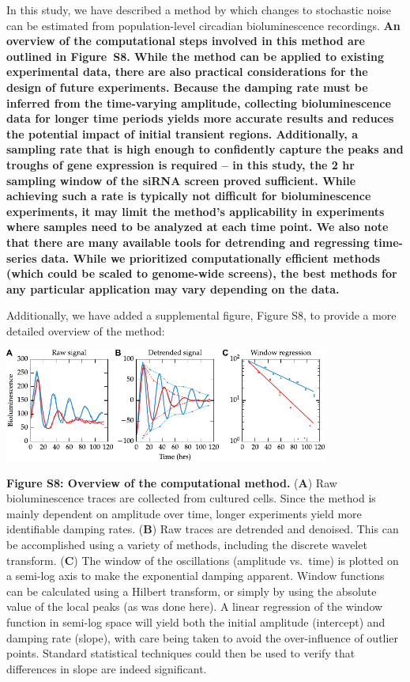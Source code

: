 \documentclass[11pt, letterpaper]{article}
\newenvironment{manuscript}[1]{\begin{center}\begin{tcolorbox}[colback=green!5!white,colframe=green!75!black,width=\textwidth,title={#1},breakable,fonttitle=\bfseries]}{\end{tcolorbox}\end{center}}
\begin{document}
\begin{manuscript}{Page 9}
 In this study, we have described a method by which changes to stochastic noise can be estimated from population-level circadian bioluminescence recordings.
 {\bfseries
An overview of the computational steps involved in this method are outlined in Figure~S8.
While the method can be applied to existing experimental data, there are also practical considerations for the design of future experiments.
Because the damping rate must be inferred from the time-varying amplitude, collecting bioluminescence data for longer time periods yields more accurate results and reduces the potential impact of initial transient regions.
Additionally, a sampling rate that is high enough to confidently capture the peaks and troughs of gene expression is required -- in this study, the 2 hr sampling window of the siRNA screen proved sufficient.
While achieving such a rate is typically not difficult for bioluminescence experiments, it may limit the method's applicability in experiments where samples need to be analyzed at each time point.
We also note that there are many available tools for detrending and regressing time-series data.
While we prioritized computationally efficient methods (which could be scaled to genome-wide screens), the best methods for any particular application may vary depending on the data.
}
\end{manuscript}

Additionally, we have added a supplemental figure, Figure S8, to provide a more detailed overview of the method:

\begin{manuscript}{Page 16}
  \begin{center}
  \includegraphics[width=0.8\textwidth]{figures/pdfs/FigS8.pdf}
  \end{center}
{\bfseries Figure S8: Overview of the computational method.} ({\bfseries A}) Raw bioluminescence traces are collected from cultured cells. Since the method is mainly dependent on amplitude over time, longer experiments yield more identifiable damping rates. ({\bfseries B}) Raw traces are detrended and denoised. This can be accomplished using a variety of methods, including the discrete wavelet transform. ({\bfseries C}) The window of the oscillations (amplitude vs.\ time) is plotted on a semi-log axis to make the exponential damping apparent. Window functions can be calculated using a Hilbert transform, or simply by using the absolute value of the local peaks (as was done here). A linear regression of the window function in semi-log space will yield both the initial amplitude (intercept) and damping rate (slope), with care being taken to avoid the over-influence of outlier points. Standard statistical techniques could then be used to verify that differences in slope are indeed significant.
\end{manuscript}
\end{document}
